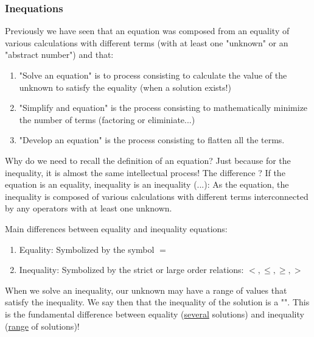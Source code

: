 	 \subsubsection{Inequations}
	 Previously we have seen that an equation was composed from an equality of various calculations with different terms (with at least one  "unknown" or an "abstract number") and that:
 	\begin{enumerate}
 	  \item "Solve an equation" is to process consisting to calculate the  value of the unknown to satisfy the equality (when a solution exists!)
 	  
 	  \item "Simplify and equation" is the process consisting to mathematically minimize the number of terms (factoring or eliminiate...)
 	  
 	  \item "Develop an equation" is the process consisting to flatten all the terms.
 	\end{enumerate}
	Why do we need to recall the definition of an equation? Just because for the inequality, it is almost the same intellectual process! The difference ? If the equation is an equality, inequality is an inequality (...): As the equation, the inequality is composed of various calculations with different terms interconnected by any operators with at least one unknown.
	
	Main differences between equality and inequality equations:
	
	\begin{enumerate}
		\item Equality: Symbolized by the symbol $=$
		\item Inequality: Symbolized by the strict or large order relations: $<, \leq, \geq, >$
	\end{enumerate}
		
	When we solve an inequality, our unknown may have a range of values that satisfy the inequality. We say then that the inequality of the solution is a "". This is the fundamental difference between equality (\underline{several} solutions) and inequality (\underline{range} of solutions)!
	
